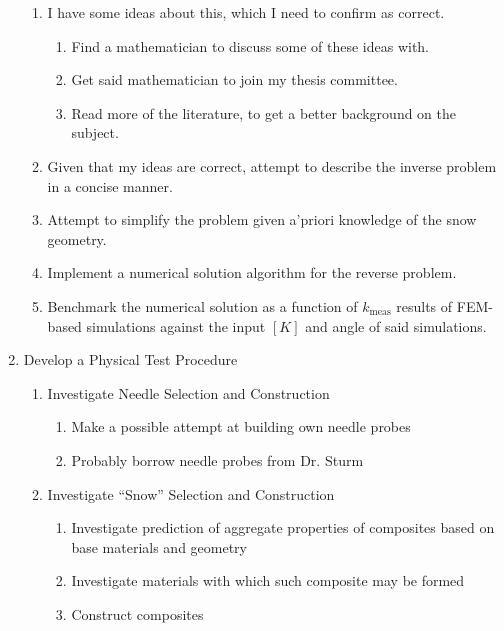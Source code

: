 \documentclass[10pt, letterpaper]{article}
\begin{document}
\begin{enumerate}
        \begin{enumerate}
            \item I have some ideas about this, which I need to confirm as correct.
            \begin{enumerate}
                \item Find a mathematician to discuss some of these ideas with.
                \item Get said mathematician to join my thesis committee.
                \item Read more of the literature, to get a better background on the subject.
            \end{enumerate}
            \item Given that my ideas are correct, attempt to describe the inverse problem in a concise manner.
            \item Attempt to simplify the problem given a'priori knowledge of the snow geometry.
            \item Implement a numerical solution algorithm for the reverse problem.
            \item Benchmark the numerical solution as a function of \(k_\textrm{meas}\) results of FEM-based simulations against the input \([K]\) and angle of said simulations.
        \end{enumerate}
        \item Develop a Physical Test Procedure
        \begin{enumerate}
            \item Investigate Needle Selection and Construction
            \begin{enumerate}
                \item Make a possible attempt at building own needle probes
                \item Probably borrow needle probes from Dr. Sturm
            \end{enumerate}
            \item Investigate ``Snow'' Selection and Construction
            \begin{enumerate}
                \item Investigate prediction of aggregate properties of composites based on base materials and geometry
                \item Investigate materials with which such composite may be formed
                \item Construct composites
            \end{enumerate}

\end{enumerate}
\end{enumerate}
\end{document}
